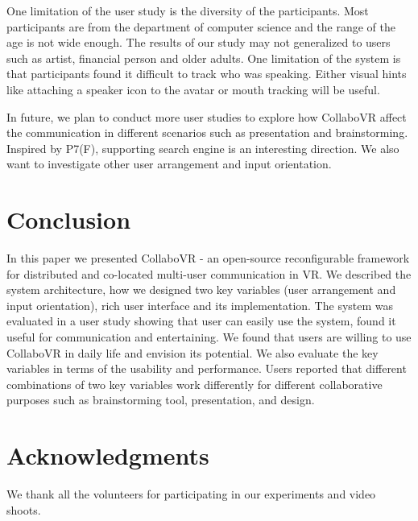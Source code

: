 \documentclass{sigchi}
\begin{document}
One limitation of the user study is the diversity of the participants. Most participants are from the department of computer science and the range of the age is not wide enough. The results of our study may not generalized to users such as artist, financial person and older adults. One limitation of the system is that participants found it difficult to track who was speaking. Either visual hints like attaching a speaker icon to the avatar or mouth tracking will be useful.

In future, we plan to conduct more user studies to explore how CollaboVR affect the communication in different scenarios such as presentation and brainstorming. Inspired by P7(F), supporting search engine is an interesting direction. We also want to investigate other user arrangement and input orientation.

\section{Conclusion}
In this paper we presented CollaboVR - an open-source reconfigurable framework for distributed and co-located multi-user communication in VR. We described the system architecture, how we designed two key variables (user arrangement and input orientation), rich user interface and its implementation. The system was evaluated in a user study showing that user can easily use the system, found it useful for communication and entertaining. We found that users are willing to use CollaboVR in daily life and envision its potential. We also evaluate the key variables in terms of the usability and performance. Users reported that different combinations of two key variables work differently for different collaborative purposes such as brainstorming tool, presentation, and design.

\section{Acknowledgments}
We thank all the volunteers for participating in our experiments and video shoots.

\end{document}

